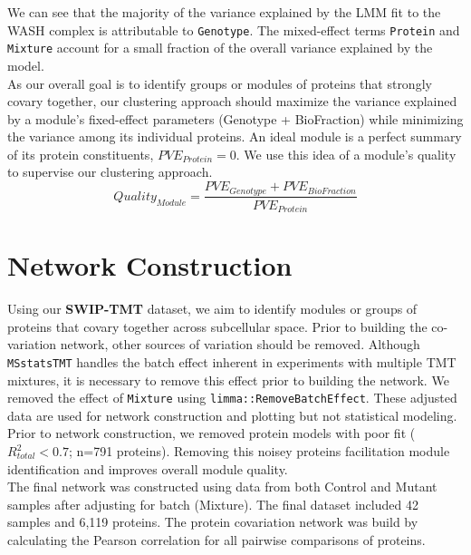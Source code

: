 \documentclass[12pt]{elife}\usepackage[]{graphicx}\usepackage[]{color}
\begin{document}
We can see that the majority of the variance explained by the LMM fit to the
WASH complex is attributable to \texttt{Genotype}. The mixed-effect terms
\texttt{Protein} and \texttt{Mixture} account for a small fraction of the 
overall variance explained by the model.\\

As our overall goal is to identify groups or modules of proteins that strongly
covary together, our clustering approach should maximize the variance explained
by a module's fixed-effect parameters (Genotype + BioFraction) while minimizing 
the variance among its individual proteins. 
An ideal module is a perfect summary of its protein constituents, 
$PVE_{Protein}=0$. We use this idea of a module's quality to supervise our 
clustering approach.\\

\begin{equation}
	Quality_{Module}=\frac{PVE_{Genotype} + PVE_{BioFraction}}{PVE_{Protein}}
\end{equation}


\section{Network Construction}

Using our \textbf{SWIP-TMT} dataset, we aim to identify modules or groups of
proteins that covary together across subcellular space. Prior to building the
co-variation network, other sources of variation should be removed. Although
\texttt{MSstatsTMT} handles the batch effect inherent in experiments with
multiple TMT mixtures, it is necessary to remove this effect prior to building
the network. We removed the effect of \texttt{Mixture} using
\texttt{limma::RemoveBatchEffect}.  These adjusted data are used for network
construction and plotting but not statistical modeling.\\

Prior to network construction, we removed protein models with poor fit 
($R^2_{total}<0.7$; n=791 proteins). Removing this noisey proteins facilitation
module identification and improves overall module quality.\\

The final network was constructed using data from both Control and Mutant 
samples after adjusting for batch (Mixture). The final dataset included 
42 samples and 6,119 proteins. The protein covariation network was build by
calculating the Pearson correlation for all pairwise comparisons of proteins.\\
\end{document}
